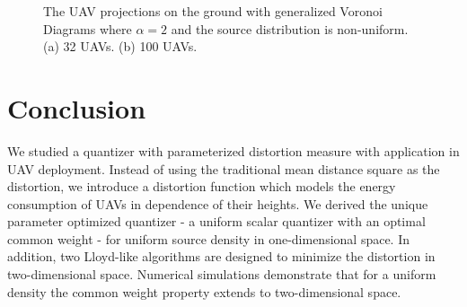 \documentclass[12pt,onecolumn,final,letterpaper]{IEEEtran}
\begin{document}
\begin{figure}[t]
\centering
{}
\hfil
{}
\captionsetup{justification=justified}
\vspace{-2ex}
\caption{\small{The UAV projections on the ground with generalized Voronoi Diagrams where $\alpha=2$ and the source distribution is non-uniform. 
(a) 32 UAVs. (b) 100 UAVs.}}
\label{uniformDistortionPartition3}
\end{figure}
\else   \fi
\section{Conclusion}
%
We studied a quantizer with parameterized distortion measure with application in UAV deployment.
Instead of using the traditional mean
distance square as the distortion, we introduce a distortion function which models the energy consumption of UAVs in
dependence of their heights.  We derived the unique parameter optimized quantizer - a uniform scalar quantizer with an
optimal common weight - for uniform source density in one-dimensional space.  In addition, two Lloyd-like algorithms are
designed to minimize the distortion in two-dimensional space.  Numerical simulations demonstrate that for a uniform
density the common weight property extends to two-dimensional space.
\end{document}
